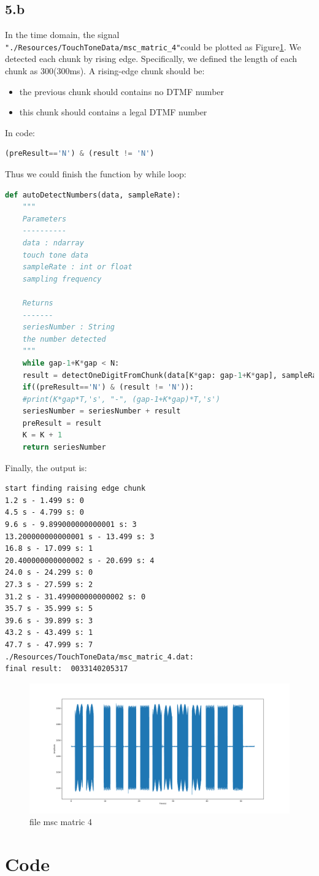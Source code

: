 \documentclass[a4paper,12pt]{article}
\begin{document}
\subsection{5.b}
In the time domain, the signal \lstinline{"./Resources/TouchToneData/msc_matric_4"}could be plotted as Figure\ref{fig_DTMFtime}. We detected each chunk by rising edge. Specifically, we defined the length of each chunk as 300(300ms). A rising-edge chunk should be:
\begin{itemize}
\item the previous chunk should contains no DTMF number
\item this chunk should contains a legal DTMF number
\end{itemize}
In code:
\begin{lstlisting}[language=Python]
(preResult=='N') & (result != 'N')
\end{lstlisting}
Thus we could finish the function by while loop:
\begin{lstlisting}[language=Python]
def autoDetectNumbers(data, sampleRate):
	"""
	Parameters
	----------
	data : ndarray
	touch tone data
	sampleRate : int or float
	sampling frequency
	
	Returns
	-------
	seriesNumber : String
	the number detected
	"""
	while gap-1+K*gap < N:
	result = detectOneDigitFromChunk(data[K*gap: gap-1+K*gap], sampleRate)
	if((preResult=='N') & (result != 'N')):
	#print(K*gap*T,'s', "-", (gap-1+K*gap)*T,'s')
	seriesNumber = seriesNumber + result
	preResult = result
	K = K + 1
	return seriesNumber
\end{lstlisting}
Finally, the output is:
\begin{lstlisting}
start finding raising edge chunk
1.2 s - 1.499 s: 0
4.5 s - 4.799 s: 0
9.6 s - 9.899000000000001 s: 3
13.200000000000001 s - 13.499 s: 3
16.8 s - 17.099 s: 1
20.400000000000002 s - 20.699 s: 4
24.0 s - 24.299 s: 0
27.3 s - 27.599 s: 2
31.2 s - 31.499000000000002 s: 0
35.7 s - 35.999 s: 5
39.6 s - 39.899 s: 3
43.2 s - 43.499 s: 1
47.7 s - 47.999 s: 7
./Resources/TouchToneData/msc_matric_4.dat:
final result:  0033140205317
\end{lstlisting}
\begin{figure}[h]   
	\centering 
	\includegraphics[width=12cm]{../Output/Figures/DTMFtime.pdf} 
	\caption{file msc matric 4}   
	\label{fig_DTMFtime}
\end{figure}


\clearpage
\section{Code}

\end{document}
